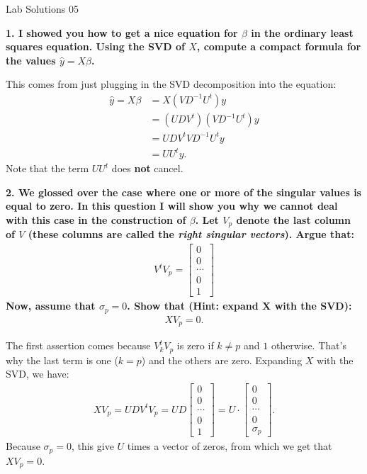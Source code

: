\documentclass[12pt,hidelinks]{article}
\numberwithin{equation}{section}
\begin{document}
{\LARGE Lab Solutions 05}

\vspace*{12pt}

\textbf{1. I showed you how to get a nice equation for $\beta$ in the ordinary
least squares equation. Using the SVD of $X$, compute a compact formula for
the values $\widehat{y} = X \beta$.}

\vspace*{12pt}

This comes from just plugging in the SVD decomposition into the equation:
\begin{align}
\widehat{y} = X \beta &= X (V D^{-1} U^t) y \\
&= (U D V^t) (V D^{-1} U^t) y \\
&= U D V^t V D^{-1} U^t y \\
&= U U^t y.
\end{align}
Note that the term $U U^t$ does \textbf{not} cancel.

\vspace*{12pt}

\textbf{2. We glossed over the case where one or more of the singular values is equal
to zero. In this question I will show you why we cannot deal with this case
in the construction of $\beta$. Let $V_p$ denote the last column of $V$ (these
columns are called the \textit{right singular vectors}). Argue that:}
\begin{align}
V^t V_p = \begin{bmatrix} 0 \\ 0 \\ \cdots \\ 0 \\ 1 \end{bmatrix}
\end{align}
\textbf{Now, assume that $\sigma_p = 0$. Show that (Hint: expand X with the SVD):}
\begin{align}
XV_p = 0.
\end{align}

\vspace*{12pt}

The first assertion comes because $V^t_k V_p$ is zero if $k\neq p$ and $1$ otherwise.
That's why the last term is one ($k=p$) and the others are zero. Expanding $X$ with
the SVD, we have:
\begin{align}
XV_p = U D V^t V_p = U D \begin{bmatrix} 0 \\ 0 \\ \cdots \\ 0 \\ 1 \end{bmatrix}
= U \cdot \begin{bmatrix} 0 \\ 0 \\ \cdots \\ 0 \\ \sigma_p \end{bmatrix}.
\end{align}
Because $\sigma_p = 0$, this give $U$ times a vector of zeros, from which we get that
$X V_p = 0$.
\end{document}
